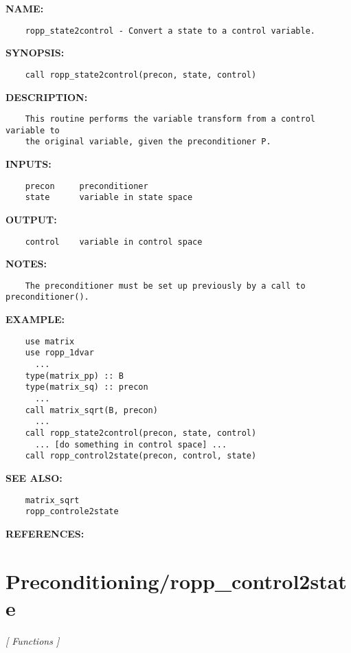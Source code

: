 \label{ch:robo34}
\label{ch:Matrix_ropp_state2control}
\textbf{NAME:}\hspace{0.08in}\begin{Verbatim}
    ropp_state2control - Convert a state to a control variable.
\end{Verbatim}
\textbf{SYNOPSIS:}\hspace{0.08in}\begin{Verbatim}
    call ropp_state2control(precon, state, control)
\end{Verbatim}
\textbf{DESCRIPTION:}\hspace{0.08in}\begin{Verbatim}
    This routine performs the variable transform from a control variable to
    the original variable, given the preconditioner P.
\end{Verbatim}
\textbf{INPUTS:}\hspace{0.08in}\begin{Verbatim}
    precon     preconditioner
    state      variable in state space
\end{Verbatim}
\textbf{OUTPUT:}\hspace{0.08in}\begin{Verbatim}
    control    variable in control space
\end{Verbatim}
\textbf{NOTES:}\hspace{0.08in}\begin{Verbatim}
    The preconditioner must be set up previously by a call to preconditioner().
\end{Verbatim}
\textbf{EXAMPLE:}\hspace{0.08in}\begin{Verbatim}
    use matrix
    use ropp_1dvar
      ...
    type(matrix_pp) :: B
    type(matrix_sq) :: precon
      ...
    call matrix_sqrt(B, precon)
      ...
    call ropp_state2control(precon, state, control)
      ... [do something in control space] ...
    call ropp_control2state(precon, control, state)
\end{Verbatim}
\textbf{SEE ALSO:}\hspace{0.08in}\begin{Verbatim}
    matrix_sqrt
    ropp_controle2state
\end{Verbatim}
\textbf{REFERENCES:}\hspace{0.08in}\section{Preconditioning/ropp\_control2state}
\textsl{[ Functions ]}


